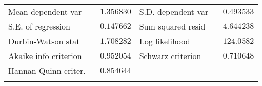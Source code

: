 \begin{tabular}{lrrrr}
\multicolumn{1}{l}{Mean dependent var}&\multicolumn{1}{r}{$1.356830$}&\multicolumn{2}{l}{S.D. dependent var}&\multicolumn{1}{r}{$0.493533$}\\
\multicolumn{1}{l}{S.E. of regression}&\multicolumn{1}{r}{$0.147662$}&\multicolumn{2}{l}{Sum squared resid}&\multicolumn{1}{r}{$4.644238$}\\
\multicolumn{1}{l}{Durbin-Watson stat}&\multicolumn{1}{r}{$1.708282$}&\multicolumn{2}{l}{Log likelihood}&\multicolumn{1}{r}{$124.0582$}\\
\multicolumn{1}{l}{Akaike info criterion}&\multicolumn{1}{r}{$-0.952054$}&\multicolumn{2}{l}{Schwarz criterion}&\multicolumn{1}{r}{$-0.710648$}\\
\multicolumn{1}{l}{Hannan-Quinn criter.}&\multicolumn{1}{r}{$-0.854644$}&\multicolumn{1}{c}{}&\multicolumn{1}{c}{}&\multicolumn{1}{c}{}\\
[4.5pt] \hline \\ [-4.5pt]
\end{tabular}